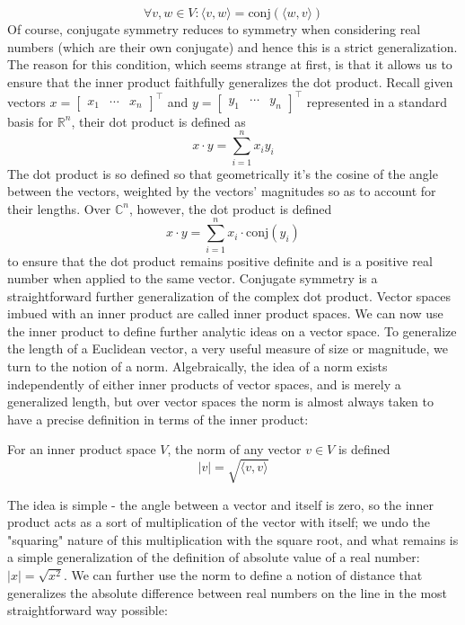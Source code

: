 \documentclass{article}
\newcommand{\n}{\leavevmode \newline}
\newcommand{\nn}{\leavevmode \newline \newline}
\newcommand{\R}{\mathbb{R}}
\newcommand{\C}{\mathbb{C}}
\begin{document}
	$$ \forall v, w \in V: \langle v, w \rangle = \text{conj}(\langle w, v \rangle) $$
Of course, conjugate symmetry reduces to symmetry when considering real numbers (which are their own conjugate) and hence this is a strict generalization. The reason for this condition, which seems strange at first, is that it allows us to ensure that the inner product faithfully generalizes the dot product. Recall given vectors $ x = \begin{bmatrix} x_1 & \cdots & x_n \end{bmatrix}^\intercal $ and $ y = \begin{bmatrix} y_1 & \cdots & y_n \end{bmatrix}^\intercal $ represented in a standard basis for $ \R^n $, their dot product is defined as
	$$ x \cdot y = \sum_{i = 1}^n x_i y_i $$
The dot product is so defined so that geometrically it's the cosine of the angle between the vectors, weighted by the vectors' magnitudes so as to account for their lengths. Over $ \C^n $, however, the dot product is defined
	$$ x \cdot y = \sum_{i = 1}^n x_i \cdot \text{conj}(y_i) $$
to ensure that the dot product remains positive definite and is a positive real number when applied to the same vector. Conjugate symmetry is a straightforward further generalization of the complex dot product.
\nn
Vector spaces imbued with an inner product are called inner product spaces. We can now use the inner product to define further analytic ideas on a vector space. To generalize the length of a Euclidean vector, a very useful measure of size or magnitude, we turn to the notion of a norm. Algebraically, the idea of a norm exists independently of either inner products of vector spaces, and is merely a generalized length, but over vector spaces the norm is almost always taken to have a precise definition in terms of the inner product:
\n
\begin{adjustwidth}{1cm}{1cm}

    For an inner product space $ V $, the norm of any vector $ v \in V $ is defined
    	$$ | v | = \sqrt{\langle v, v \rangle} $$

\end{adjustwidth}
\n
The idea is simple - the angle between a vector and itself is zero, so the inner product acts as a sort of multiplication of the vector with itself; we undo the "squaring" nature of this multiplication with the square root, and what remains is a simple generalization of the definition of absolute value of a real number: $ | x | = \sqrt{x^2} $. We can further use the norm to define a notion of distance that generalizes the absolute difference between real numbers on the line in the most straightforward way possible:
\end{document}
